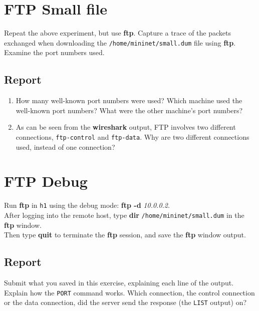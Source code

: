 \documentclass[10pt,a4paper]{article}
\numberwithin{equation}{section}
\numberwithin{figure}{section}
\numberwithin{table}{section}
\begin{document}
\section{FTP Small file}
Repeat the above experiment, but use \textbf{ftp}.
Capture a trace of the packets exchanged when downloading the \texttt{/home/mininet/small.dum} file using \textbf{ftp}. \\
Examine the port numbers used.
\subsection*{Report}
\begin{enumerate}
	\item How many well-known port numbers were used?
	Which machine used the well-known port numbers?
	What were the other machine’s port numbers?
	\item As can be seen from the \textbf{wireshark} output, FTP involves two different connections, \texttt{ftp-control} and \texttt{ftp-data}.
	Why are two different connections used, instead of one connection?
\end{enumerate}

\section{FTP Debug}
Run \textbf{ftp} in \texttt{h1} using the debug mode: \textbf{ftp -d} \textit{10.0.0.2}. \\
After logging into the remote host, type \textbf{dir} \texttt{/home/mininet/small.dum} in the \textbf{ftp} window. \\
Then type \textbf{quit} to terminate the \textbf{ftp} session, and save the \textbf{ftp} window output.
\subsection*{Report}
Submit what you saved in this exercise, explaining each line of the output.
Explain how the \texttt{PORT} command works.
Which connection, the control connection or the data connection, did the server send the response (the \texttt{LIST} output) on?
\end{document}
